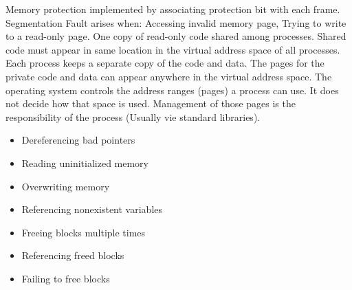 \documentclass[number]{notes}
\begin{document}
\begin{landscape}
\begin{multicols}{3}
Memory protection implemented by associating protection bit with each frame.
Segmentation Fault arises when: Accessing invalid memory page, Trying to write to a read-only page.
One copy of read-only code shared among processes. Shared code must appear in same location in the virtual address space of all processes.\\
Each process keeps a separate copy of the code and data. The pages for the private code and data can appear anywhere in the virtual address space.
The operating system controls the address ranges (pages) a process can use. It does not decide how that space is used. Management of those pages is the responsibility of the process (Usually vie standard libraries).

\begin{itemize}[nolistsep]
    \item Dereferencing bad pointers
    \item Reading uninitialized memory
    \item Overwriting memory
    \item Referencing nonexistent variables
    \item Freeing blocks multiple times
    \item Referencing freed blocks
    \item Failing to free blocks
\end{itemize}


\end{multicols}
\end{landscape}
\end{document}
